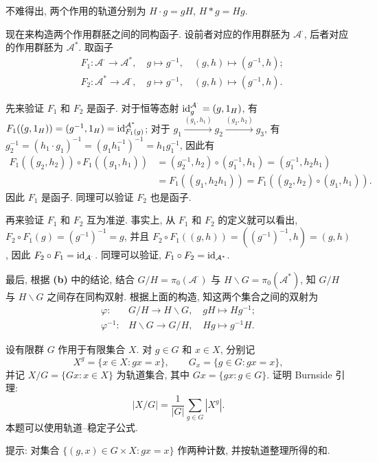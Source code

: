 \documentclass{article}
\begin{document}
\begin{solution}
	不难得出, 两个作用的轨道分别为 $H \cdot g = gH$, $H * g = Hg$. 

	现在来构造两个作用群胚之间的同构函子. 设前者对应的作用群胚为 $\mathcal{A}^{\cdot}$, 后者对应的作用群胚为 $\mathcal{A}^{*}$. 取函子
	\begin{align*}
		&F_1: \mathcal{A}^\cdot \to \mathcal{A}^*, \quad 
		g \mapsto g^{-1}, \quad (g, h) \mapsto (g^{-1}, h) ; \\
		&F_2: \mathcal{A}^* \to \mathcal{A}^\cdot, \quad 
		g \mapsto g^{-1}, \quad (g,h) \mapsto (g^{-1}, h).
	\end{align*}

	先来验证 $F_1$ 和 $F_2$ 是函子. 对于恒等态射 $\operatorname{id}_{g}^{\mathcal{A}^\cdot} = (g, 1_H)$, 有 $F_1((g, 1_H)) = (g^{-1}, 1_H) = \operatorname{id}_{F_1(g)}^{\mathcal{A}^*}	$; 对于 $g_1 \xrightarrow{(g_1, h_1)} g_2 \xrightarrow{(g_2, h_2)} g_3$, 有 $g_2^{-1} = (h_1 \cdot g_1)^{-1} = (g_1h_1^{-1})^{-1} = h_1 g_1^{-1}$, 因此有
	\begin{align*}
		F_1((g_2, h_2)) \circ F_1((g_1, h_1)) &= (g_2^{-1}, h_2) \circ (g_1^{-1}, h_1) = (g_1^{-1}, h_2h_1) \\
		&= F_1((g_1, h_2h_1)) = F_1((g_2, h_2) \circ (g_1, h_1)). 
	\end{align*}
	因此 $F_1$ 是函子. 同理可以验证 $F_2$ 也是函子.

	再来验证 $F_1$ 和 $F_2$ 互为准逆. 事实上, 从 $F_1$ 和 $F_2$ 的定义就可以看出, $F_2 \circ F_1(g) = (g^{-1})^{-1} = g$, 并且 $F_2 \circ F_1((g,h)) = ((g^{-1})^{-1}, h) = (g, h)$, 因此 $F_2 \circ F_1 = \operatorname{id}_{\mathcal{A}^\cdot}$. 同理可以验证, $F_1 \circ F_2 = \operatorname{id}_{\mathcal{A}^*}$. 

	最后, 根据 \textbf{(b)} 中的结论, 结合 $G/H = \pi_0(\mathcal{A^\cdot})$ 与 $H\backslash G = \pi_0(\mathcal{A^*})$, 知 $G/H$ 与 $H\backslash G$ 之间存在同构双射. 根据上面的构造, 知这两个集合之间的双射为
	\begin{align*}
		\varphi:& G/H \to H \backslash G, \quad gH \mapsto Hg^{-1} ; \\
		\varphi^{-1}:& H \backslash G \to G/H, \quad Hg \mapsto g^{-1}H.
	\end{align*}
\end{solution}


\begin{problem}
设有限群 $G$ 作用于有限集合 $X$. 对 $g\in G$ 和 $x\in X$, 分别记
\[
  X^g=\{x\in X:gx=x\},\qquad G_x=\{g\in G:gx=x\},
\]
并记 $X/G=\{Gx:x\in X\}$ 为轨道集合, 其中 $Gx=\{gx:g\in G\}$. 证明 Burnside 引理:
\[
  |X/G|=\frac{1}{|G|}\sum_{g\in G}|X^g|.
\]
本题可以使用轨道--稳定子公式.

提示: 对集合 $\{(g,x)\in G\times X:gx=x\}$ 作两种计数, 并按轨道整理所得的和.
\end{problem}
\end{document}
